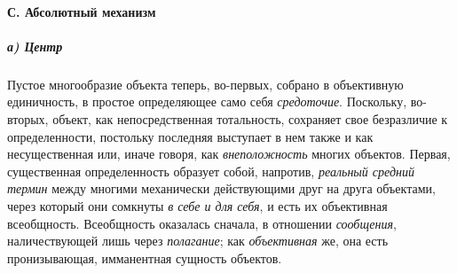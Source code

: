 \documentclass[twoside]{article}
\begin{document}
{{{{{\paragraph[С. Абсолютный механизм]{С. Абсолютный механизм}
\subparagraph[а) Центр]{а) Центр}
Пустое многообразие объекта теперь, во-первых, собрано в
объективную единичность, в простое определяющее само себя
{\em средоточие}.
Поскольку, во-вторых, объект, как непосредственная
тотальность, сохраняет свое безразличие к определенности, постольку
последняя выступает в нем также и как несущественная или, иначе говоря, как
{\em внеположность}
многих объектов. Первая, существенная определенность образует
собой, напротив, {\em реальный средний
термин} между многими механически действующими друг на друга
объектами, через который они сомкнуты
{\em в себе и для себя},
и есть их объективная всеобщность. Всеобщность оказалась
сначала, в отношении {\em сообщения},
наличествующей лишь через
{\em полагание}; как
{\em объективная} же, она
есть пронизывающая, имманентная сущность объектов.

}}}}}
\end{document}

